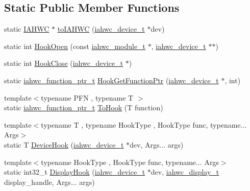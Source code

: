 \subsection*{Static Public Member Functions}
\begin{DoxyCompactItemize}
\item 
static \mbox{\hyperlink{classhwcomposer_1_1IAHWC}{I\+A\+H\+WC}} $\ast$ \mbox{\hyperlink{classhwcomposer_1_1IAHWC_a9f236ac26693721c4c25f64a01e24307}{to\+I\+A\+H\+WC}} (\mbox{\hyperlink{iahwc_8h_aa44e63a48d7c328d160f28888a6b3edd}{iahwc\+\_\+device\+\_\+t}} $\ast$dev)
\item 
static int \mbox{\hyperlink{classhwcomposer_1_1IAHWC_af4d87455f682c18ae34901c59abc9e3e}{Hook\+Open}} (const \mbox{\hyperlink{iahwc_8h_a6a0009d570fc041f403dee1e0fd68cf9}{iahwc\+\_\+module\+\_\+t}} $\ast$, \mbox{\hyperlink{iahwc_8h_aa44e63a48d7c328d160f28888a6b3edd}{iahwc\+\_\+device\+\_\+t}} $\ast$$\ast$)
\item 
static int \mbox{\hyperlink{classhwcomposer_1_1IAHWC_a215e268fcbbc3e7f8b025d2835f9cf35}{Hook\+Close}} (\mbox{\hyperlink{iahwc_8h_aa44e63a48d7c328d160f28888a6b3edd}{iahwc\+\_\+device\+\_\+t}} $\ast$)
\item 
static \mbox{\hyperlink{iahwc_8h_a214bf51cce821fdb7b24210088c12cad}{iahwc\+\_\+function\+\_\+ptr\+\_\+t}} \mbox{\hyperlink{classhwcomposer_1_1IAHWC_aa5e1fbf26a4ea394a6acf30104e87c75}{Hook\+Get\+Function\+Ptr}} (\mbox{\hyperlink{iahwc_8h_aa44e63a48d7c328d160f28888a6b3edd}{iahwc\+\_\+device\+\_\+t}} $\ast$, int)
\item 
{\footnotesize template$<$typename P\+FN , typename T $>$ }\\static \mbox{\hyperlink{iahwc_8h_a214bf51cce821fdb7b24210088c12cad}{iahwc\+\_\+function\+\_\+ptr\+\_\+t}} \mbox{\hyperlink{classhwcomposer_1_1IAHWC_a87c94f049fd6c0212a94478e2e4faa1d}{To\+Hook}} (T function)
\item 
{\footnotesize template$<$typename T , typename Hook\+Type , Hook\+Type func, typename... Args$>$ }\\static T \mbox{\hyperlink{classhwcomposer_1_1IAHWC_a85c7dbeca1457ee0dff40336e74a8b19}{Device\+Hook}} (\mbox{\hyperlink{iahwc_8h_aa44e63a48d7c328d160f28888a6b3edd}{iahwc\+\_\+device\+\_\+t}} $\ast$dev, Args... args)
\item 
{\footnotesize template$<$typename Hook\+Type , Hook\+Type func, typename... Args$>$ }\\static int32\+\_\+t \mbox{\hyperlink{classhwcomposer_1_1IAHWC_aea66337d6982d1d9522e15d35eeee1d6}{Display\+Hook}} (\mbox{\hyperlink{iahwc_8h_aa44e63a48d7c328d160f28888a6b3edd}{iahwc\+\_\+device\+\_\+t}} $\ast$dev, \mbox{\hyperlink{iahwc_8h_a026bdbdf86a828fa3a4d800226e8f8c0}{iahwc\+\_\+display\+\_\+t}} display\+\_\+handle, Args... args)
$$
\end{DoxyCompactItemize}
